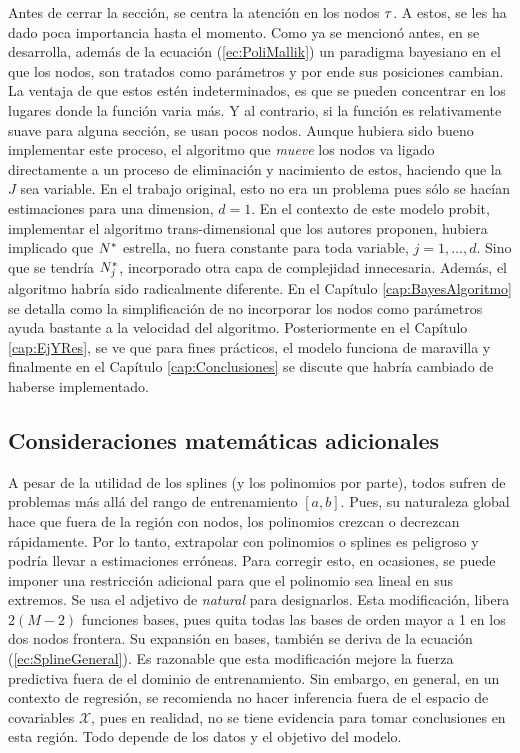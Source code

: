 \documentclass[../Main/Main.tex]{subfiles}
\begin{document}
Antes de cerrar la sección, se centra la atención en los nodos $\tau$. A estos, se les ha dado poca importancia hasta el momento. Como ya se mencionó antes, en \citet{mallik1998automatic} se desarrolla, además de la ecuación (\ref{ec:PoliMallik}) un paradigma bayesiano en el que los nodos, son tratados como parámetros y por ende sus posiciones cambian. La ventaja de que estos estén indeterminados, es que se pueden concentrar en los lugares donde la función varia más. Y al contrario, si la función es relativamente suave para alguna sección, se usan pocos nodos. Aunque hubiera sido bueno implementar este proceso, el algoritmo que \textit{mueve} los nodos va ligado directamente a un proceso de eliminación y nacimiento de estos, haciendo que la $J$ sea variable. En el trabajo original, esto no era un problema pues sólo se hacían estimaciones para una dimension, $d = 1$. En el contexto de este modelo probit, implementar el algoritmo trans-dimensional que los autores proponen, hubiera implicado que $N^*$ estrella, no fuera constante para toda variable, $j = 1,\ldots,d$. Sino que se tendría $N^*_j$, incorporado otra capa de complejidad innecesaria. Además, el algoritmo habría sido radicalmente diferente. En el Capítulo \ref{cap:BayesAlgoritmo} se detalla como la simplificación de no incorporar los nodos como parámetros ayuda bastante a la velocidad del algoritmo. Posteriormente en el Capítulo \ref{cap:EjYRes}, se ve que para fines prácticos, el modelo funciona de maravilla y finalmente en el Capítulo \ref{cap:Conclusiones} se discute que habría cambiado de haberse implementado. 

\subsection{Consideraciones matemáticas adicionales}
A pesar de la utilidad de los splines (y los polinomios por parte), todos sufren de problemas más allá del rango de entrenamiento $[a,b]$. Pues, su naturaleza global hace que fuera de la región con nodos, los polinomios crezcan o decrezcan rápidamente. Por lo tanto, extrapolar con polinomios o splines es peligroso y podría llevar a estimaciones erróneas. Para corregir esto, en ocasiones, se puede imponer una restricción adicional para que el polinomio sea lineal en sus extremos. Se usa el adjetivo de \textit{natural} para designarlos. Esta modificación, libera $2(M-2)$ funciones bases, pues quita todas las bases de orden mayor a 1 en los dos nodos frontera. Su expansión en bases, también se deriva de la ecuación (\ref{ec:SplineGeneral}). Es razonable que esta modificación mejore la fuerza predictiva fuera de el dominio de entrenamiento. Sin embargo, en general, en un contexto de regresión, se recomienda no hacer inferencia fuera de el espacio de covariables $\mathcal{X}$, pues en realidad, no se tiene evidencia para tomar conclusiones en esta región.  Todo depende de los datos y el objetivo del modelo.
\end{document}
